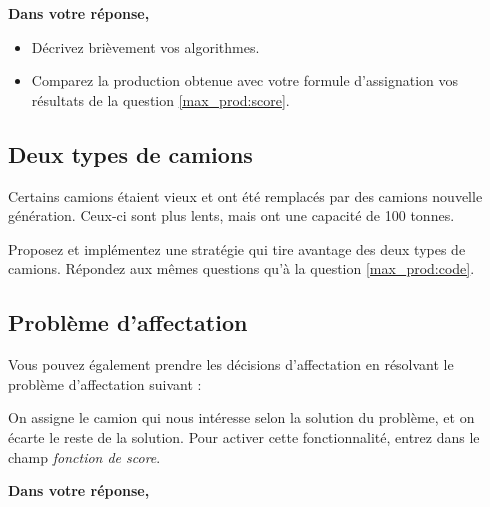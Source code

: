 
\vspace{10pt}
\noindent\textbf{Dans votre réponse,} 

\begin{itemize}
	\item Décrivez brièvement vos algorithmes.
	\item Comparez la production obtenue avec votre formule d'assignation vos résultats de la question \ref{max_prod:score}.
\end{itemize}


\subsection{Deux types de camions}
Certains camions étaient vieux et ont été remplacés par des camions nouvelle génération. Ceux-ci sont plus lents, mais ont une capacité de 100 tonnes.

Proposez et implémentez une stratégie qui tire avantage des deux types de camions. Répondez aux mêmes questions qu'à la question \ref{max_prod:code}.



\subsection{Problème d'affectation}

Vous pouvez également prendre les décisions d'affectation en résolvant le problème d'affectation suivant : 


On assigne le camion qui nous intéresse selon la solution du problème, et on écarte le reste de la solution. Pour activer cette fonctionnalité, entrez  dans le champ \textit{fonction de score}.

\vspace{10pt}
\noindent\textbf{Dans votre réponse,} 

